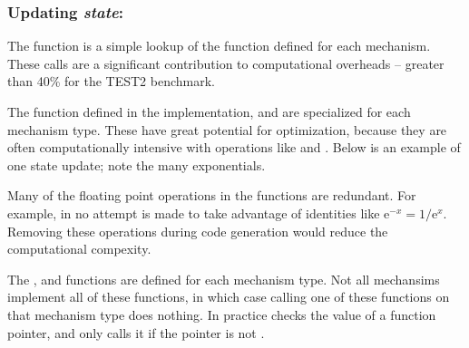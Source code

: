 \subsubsection{Updating \emph{state}: }
The  function is a simple lookup of the  function defined for each mechanism. These calls are a significant contribution to computational overheads -- greater than 40\% for the TEST2 benchmark.


The  function defined in the \hoc implementation, and are specialized for each mechanism type. These have great potential for optimization, because they are often computationally intensive with operations like  and . Below is an example of one state update; note the many exponentials.


\begin{note}
    Many of the floating point operations in the  functions are redundant. For example, in  no attempt is made to take advantage of identities like $\text{e}^{-x}=1/\text{e}^{x}$. Removing these operations during code generation would reduce the computational compexity.
\end{note}

\begin{note}
    The ,  and  functions are defined for each mechanism type. Not all mechansims implement all of these functions, in which case calling one of these functions on that mechanism type does nothing. In practice \neuron checks the value of a function pointer, and only calls it if the pointer is not .
\end{note}
